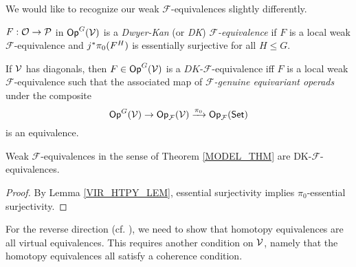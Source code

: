 \documentclass[a4paper,10pt
,draft
]{article}%
\renewcommand{\F}{\mathcal F}
\renewcommand{\1}{\ensuremath{\mathbb{id}}}
\begin{document}
We would like to recognize our weak $\F$-equivalences slightly differently.

\begin{definition}
      $F: \mathcal{O} \to \mathcal{P}$ in $\mathsf{Op}^G(\mathcal V)$ is a \textit{Dwyer-Kan} (or \textit{DK}) \textit{$\F$-equivalence} if
      $F$ is a local weak $\F$-equivalence and
      $j^{\**}\pi_0(F^H)$ is essentially surjective for all $H \leq G$.
\end{definition}

\begin{remark}
      If $\mathcal V$ has diagonals, then $F \in \mathsf{Op}^G(\mathcal V)$ is a $DK$-$\F$-equivalence iff
      $F$ is a local weak $\F$-equivalence such that 
      the associated map of \textit{$\F$-genuine equivariant operads} under the composite
      \begin{equation}
            \Op^G(\V) \to \Op_\F(\V) \xrightarrow{\pi_0} \Op_\F(\Set) 
      \end{equation}
      is an equivalence.
\end{remark}

\begin{proposition}
      \label{WE_ARE_DK_PROP}
      Weak $\F$-equivalences in the sense of Theorem \ref{MODEL_THM} are DK-$\F$-equivalences.
\end{proposition}
\begin{proof}
      By Lemma \ref{VIR_HTPY_LEM}, essential surjectivity implies $\pi_0$-essential surjectivity. 
\end{proof}


For the reverse direction (cf. \cite[\S 2]{BM13}), we need to show that
homotopy equivalences are all virtual equivalences.
This requires another condition on $\mathcal V$, namely that the homotopy equivalences all satisfy a coherence condition.
\end{document}
